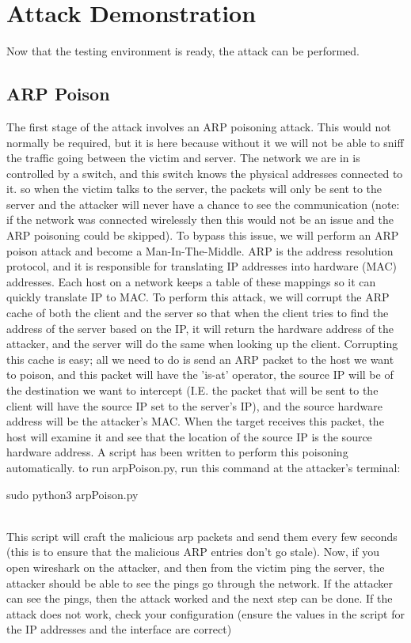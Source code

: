 \documentclass{article}
\begin{document}
\section{Attack Demonstration}
Now that the testing environment is ready, the attack can be performed.
\subsection{ARP Poison}
The first stage of the attack involves an ARP poisoning attack. This would
not normally be required, but it is here because without it we will not be 
able to sniff the traffic going between the victim and server. The network
we are in is controlled by a switch, and this switch knows the physical 
addresses connected to it. so when the victim talks to the server, the 
packets will only be sent to the server and the attacker will never have a 
chance to see the communication (note: if the network was connected wirelessly
then this would not be an issue and the ARP poisoning could be skipped). To
bypass this issue, we will perform an ARP poison attack and become a 
Man-In-The-Middle.
ARP is the address resolution protocol, and it is responsible for translating
IP addresses into hardware (MAC) addresses. Each host on a network keeps a table
of these mappings so it can quickly translate IP to MAC. To perform this attack, 
we will corrupt the ARP cache of both the client and the server so that when the 
client tries to find the address of the server based on the IP, it will return 
the hardware address of the attacker, and the server will do the same when 
looking up the client. Corrupting this cache is easy; all we need to do is send
an ARP packet to the host we want to poison, and this packet will have the 'is-at'
operator, the source IP will be of the destination we want to intercept 
(I.E. the packet that will be sent to the client will have the source IP set to
the server's IP), and the source hardware address will be the attacker's MAC.
When the target receives this packet, the host will examine it and see that 
the location of the source IP is the source hardware address. A script has been
written to perform this poisoning automatically. to run arpPoison.py, run this
command at the attacker's terminal:\\
\begin{verb}
sudo python3 arpPoison.py
\end{verb}
\\This script will craft the malicious arp packets and send them every few seconds
(this is to ensure that the malicious ARP entries don't go stale). Now, if you
open wireshark on the attacker, and then from the victim ping the server, the
attacker should be able to see the pings go through the network. If the attacker
can see the pings, then the attack worked and the next step can be done.
If the attack does not work, check your configuration (ensure the values in the
script for the IP addresses and the interface are correct)
\end{document}
